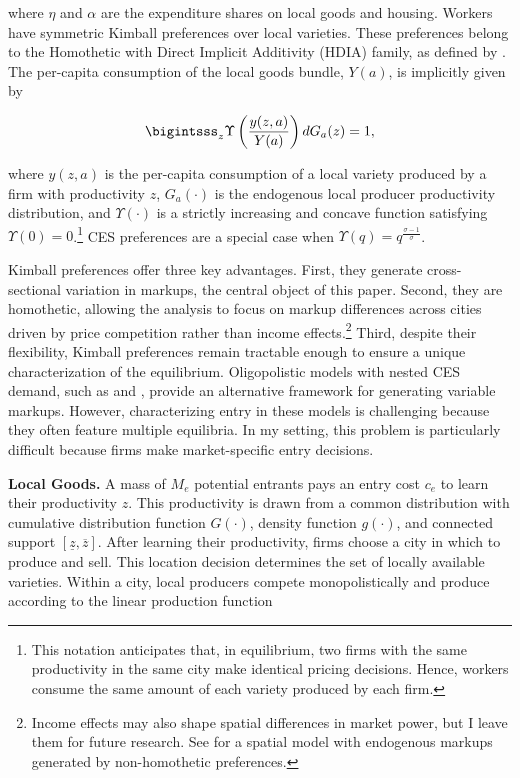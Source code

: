where $\eta$ and $\alpha$ are the expenditure shares on local goods and housing. Workers have symmetric Kimball preferences \parencite{Kimball95} over local varieties. These preferences belong to the Homothetic with Direct Implicit Additivity (HDIA) family, as defined by \textcite{Matsuyama&Ushev17}. The per-capita consumption of the local goods bundle, $Y(a)$, is implicitly given by  

\begin{equation}\label{eq:kimball}
	\bigintsss_{z} \Upsilon\left(\frac{y(z,a)}{Y(a)}\right) dG_a(z) = 1,
\end{equation}  

where $y(z,a)$ is the per-capita consumption of a local variety produced by a firm with productivity $z$, $G_a(\cdot)$ is the endogenous local producer productivity distribution, and $\Upsilon(\cdot)$ is a strictly increasing and concave function satisfying $\Upsilon(0) = 0$.\footnote{This notation anticipates that, in equilibrium, two firms with the same productivity in the same city make identical pricing decisions. Hence, workers consume the same amount of each variety produced by each firm.} CES preferences are a special case when $\Upsilon(q) = q^\frac{\sigma-1}{\sigma}$.  

Kimball preferences offer three key advantages. First, they generate cross-sectional variation in markups, the central object of this paper. Second, they are homothetic, allowing the analysis to focus on markup differences across cities driven by price competition rather than income effects.\footnote{Income effects may also shape spatial differences in market power, but I leave them for future research. See \textcite{Combesetal12} for a spatial model with endogenous markups generated by non-homothetic preferences.} Third, despite their flexibility, Kimball preferences remain tractable enough to ensure a unique characterization of the equilibrium. Oligopolistic models with nested CES demand, such as \textcite{Atkeson&Burstein08} and \textcite{EdmondMidrigan&Xu15}, provide an alternative framework for generating variable markups. However, characterizing entry in these models is challenging because they often feature multiple equilibria. In my setting, this problem is particularly difficult because firms make market-specific entry decisions.

\textbf{Local Goods.} A mass of $M_e$ potential entrants pays an entry cost $c_e$ to learn their productivity $z$. This productivity is drawn from a common distribution with cumulative distribution function $G(\cdot)$, density function $g(\cdot)$, and connected support $[\underline{z}, \overline{z}]$. After learning their productivity, firms choose a city in which to produce and sell. This location decision determines the set of locally available varieties. Within a city, local producers compete monopolistically and produce according to the linear production function  

